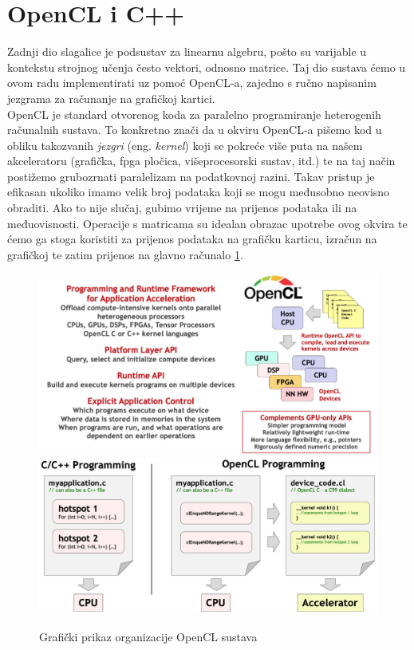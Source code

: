\documentclass[zavrsnirad]{fer}
\begin{document}
\section{OpenCL i C++}
Zadnji dio slagalice je podsustav za linearnu algebru, pošto su varijable u kontekstu strojnog učenja često vektori, odnosno matrice. Taj dio sustava ćemo u ovom radu implementirati uz pomoć OpenCL-a, zajedno s ručno napisanim jezgrama za računanje na grafičkoj kartici.
\\
OpenCL je standard otvorenog koda za paralelno programiranje heterogenih računalnih sustava. To konkretno znači da u okviru OpenCL-a pišemo kod u obliku takozvanih \textit{jezgri} (eng. \textit{kernel}) koji se pokreće više puta na našem akceleratoru (grafička, fpga pločica, višeprocesorski sustav, itd.) te na taj način postižemo grubozrnati paralelizam na podatkovnoj razini. Takav pristup je efikasan ukoliko imamo velik broj podataka koji se mogu međusobno neovisno obraditi. Ako to nije slučaj, gubimo vrijeme na prijenos podataka ili na međuovisnosti. Operacije s matricama su idealan obrazac upotrebe ovog okvira te ćemo ga stoga koristiti za prijenos podataka na grafičku karticu, izračun na grafičkoj te zatim prijenos na glavno računalo \ref{slk:opencl}.
\\
\begin{figure}[h]
  \centering
  \includegraphics[width=0.6\linewidth]{./slike/opencl.jpg}
  \includegraphics[width=0.6\linewidth]{./slike/opencl_model.jpg}
  \caption{Grafički prikaz organizacije OpenCL sustava}
  \cite{opencl}
  \label{slk:opencl}
\end{figure}

\end{document}
